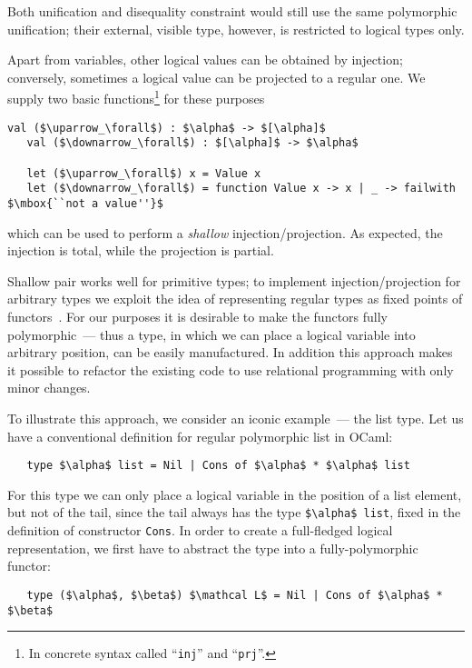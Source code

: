 Both unification and disequality constraint would still use the same polymorphic unification; their external, visible type,
however, is restricted to logical types only.

Apart from variables, other logical values can be obtained by injection; conversely, sometimes a logical value can be projected to
a regular one. We supply two basic functions\footnote{In concrete syntax called ``\lstinline{inj}'' and ``\lstinline{prj}''.}
for these purposes

\begin{lstlisting}[mathescape=true]
   val ($\uparrow_\forall$) : $\alpha$ -> $[\alpha]$
   val ($\downarrow_\forall$) : $[\alpha]$ -> $\alpha$

   let ($\uparrow_\forall$) x = Value x
   let ($\downarrow_\forall$) = function Value x -> x | _ -> failwith $\mbox{``not a value''}$
\end{lstlisting}

\noindent which can be used to perform a \emph{shallow} injection/projection. As expected, the injection is total, while the projection is partial.

Shallow pair works well for primitive types; to implement injection/projection for arbitrary types we exploit the 
idea of representing regular types as fixed points of functors~\cite{ALaCarte}. For our purposes it is desirable to make
the functors fully polymorphic~--- thus a type, in which we can place a logical variable into arbitrary position,
can be easily manufactured. In addition this approach makes it possible to refactor the existing code to use relational
programming with only minor changes.

To illustrate this approach, we consider an iconic example~--- the list type. Let us have a conventional definition
for regular polymorphic list in OCaml:

\begin{lstlisting}
   type $\alpha$ list = Nil | Cons of $\alpha$ * $\alpha$ list
\end{lstlisting} 

For this type we can only place a logical variable in the position of a list element, but not of the tail, since the tail
always has the type \lstinline{$\alpha$ list}, fixed in the definition of constructor \lstinline{Cons}. In order to create 
a full-fledged logical representation, we first have to abstract the type into a fully-polymorphic functor:

\begin{lstlisting}
   type ($\alpha$, $\beta$) $\mathcal L$ = Nil | Cons of $\alpha$ * $\beta$
\end{lstlisting}

